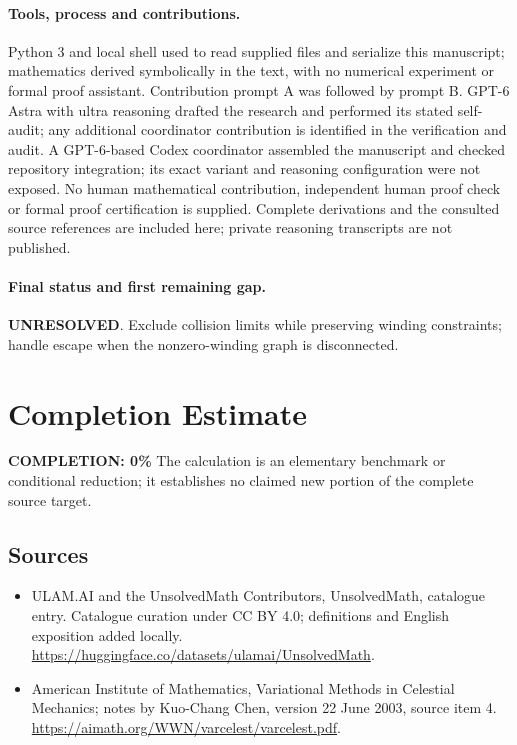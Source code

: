 \documentclass[11pt]{article}
\begin{document}
\paragraph{Tools, process and contributions.}
Python 3 and local shell used to read supplied files and serialize this manuscript; mathematics derived symbolically in the text, with no numerical experiment or formal proof assistant. Contribution prompt A was followed by prompt B. GPT-6 Astra with ultra reasoning drafted the research and performed its stated self-audit; any additional coordinator contribution is identified in the verification and audit. A GPT-6-based Codex coordinator assembled the manuscript and checked repository integration; its exact variant and reasoning configuration were not exposed. No human mathematical contribution, independent human proof check or formal proof certification is supplied. Complete derivations and the consulted source references are included here; private reasoning transcripts are not published.

\paragraph{Final status and first remaining gap.}
\textbf{UNRESOLVED}. Exclude collision limits while preserving winding constraints; handle escape when the nonzero-winding graph is disconnected.

\section{Completion Estimate}
\noindent\textbf{COMPLETION: 0\%}
The calculation is an elementary benchmark or conditional reduction; it establishes no claimed new portion of the complete source target.

\subsection{Sources}
\begin{itemize}
\item[\hypertarget{source:statement:1}{S1}] ULAM.AI and the UnsolvedMath Contributors, UnsolvedMath, catalogue entry. Catalogue curation under CC BY 4.0; definitions and English exposition added locally.
\url{https://huggingface.co/datasets/ulamai/UnsolvedMath}.
\item[\hypertarget{source:statement:2}{S2}] American Institute of Mathematics, Variational Methods in Celestial Mechanics; notes by Kuo-Chang Chen, version 22 June 2003, source item 4.
\url{https://aimath.org/WWN/varcelest/varcelest.pdf}.
\end{itemize}
\label{end:statement}
\end{document}
